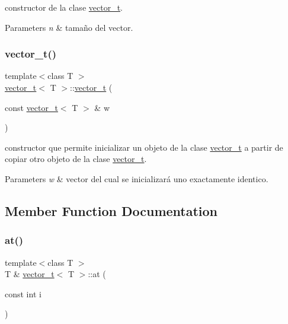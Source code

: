 constructor de la clase \hyperlink{classvector__t}{vector\+\_\+t}. 


\begin{DoxyParams}{Parameters}
{\em n} & tamaño del vector. \\
\hline
\end{DoxyParams}
\mbox{\label{classvector__t_a1f513bf5bf1305e5847e723d7c5d84a4}} 
\subsubsection{\texorpdfstring{vector\+\_\+t()}{vector\_t()}\hspace{0.1cm}{\footnotesize\ttfamily [2/2]}}
{\footnotesize\ttfamily template$<$class T $>$ \\
\hyperlink{classvector__t}{vector\+\_\+t}$<$ T $>$\+::\hyperlink{classvector__t}{vector\+\_\+t} (\begin{DoxyParamCaption}\item[{const \hyperlink{classvector__t}{vector\+\_\+t}$<$ T $>$ \&}]{w }\end{DoxyParamCaption})}



constructor que permite inicializar un objeto de la clase \hyperlink{classvector__t}{vector\+\_\+t} a partir de copiar otro objeto de la clase \hyperlink{classvector__t}{vector\+\_\+t}. 


\begin{DoxyParams}{Parameters}
{\em w} & vector del cual se inicializará uno exactamente identico. \\
\hline
\end{DoxyParams}


\subsection{Member Function Documentation}
\mbox{\label{classvector__t_a17298d70babc63ae96d134506b01568e}} 
\subsubsection{\texorpdfstring{at()}{at()}\hspace{0.1cm}{\footnotesize\ttfamily [1/2]}}
{\footnotesize\ttfamily template$<$class T $>$ \\
T \& \hyperlink{classvector__t}{vector\+\_\+t}$<$ T $>$\+::at (\begin{DoxyParamCaption}\item[{const int}]{i }\end{DoxyParamCaption})}



